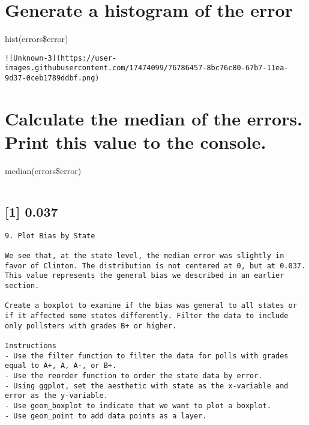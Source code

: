 \documentclass[
]{article}
\begin{document}
\begin{verbatim}
\end{verbatim}

\hypertarget{generate-a-histogram-of-the-error}{%
\section{Generate a histogram of the
error}\label{generate-a-histogram-of-the-error}}

hist(errors\$error)

\begin{verbatim}
![Unknown-3](https://user-images.githubusercontent.com/17474099/76786457-8bc76c80-67b7-11ea-9d37-0ceb1789ddbf.png)
\end{verbatim}

\hypertarget{calculate-the-median-of-the-errors.-print-this-value-to-the-console.}{%
\section{Calculate the median of the errors. Print this value to the
console.}\label{calculate-the-median-of-the-errors.-print-this-value-to-the-console.}}

median(errors\$error)

\begin{verbatim}
\end{verbatim}

\hypertarget{section}{%
\subsection{{[}1{]} 0.037}\label{section}}

\begin{verbatim}
9. Plot Bias by State

We see that, at the state level, the median error was slightly in favor of Clinton. The distribution is not centered at 0, but at 0.037. This value represents the general bias we described in an earlier section.

Create a boxplot to examine if the bias was general to all states or if it affected some states differently. Filter the data to include only pollsters with grades B+ or higher.

Instructions
- Use the filter function to filter the data for polls with grades equal to A+, A, A-, or B+.
- Use the reorder function to order the state data by error.
- Using ggplot, set the aesthetic with state as the x-variable and error as the y-variable.
- Use geom_boxplot to indicate that we want to plot a boxplot.
- Use geom_point to add data points as a layer.
\end{verbatim}
\end{document}
